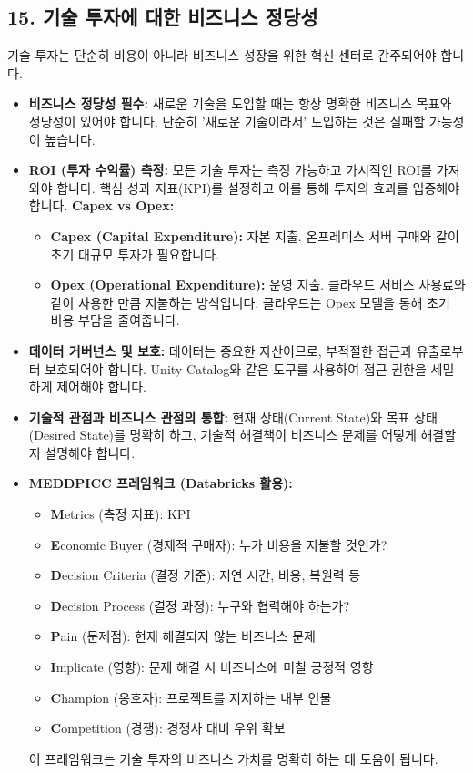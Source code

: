 \documentclass[11pt,a4paper]{article}
\begin{document}
\subsection*{15. 기술 투자에 대한 비즈니스 정당성}

기술 투자는 단순히 비용이 아니라 비즈니스 성장을 위한 혁신 센터로 간주되어야 합니다.

\begin{itemize}
    \item \textbf{비즈니스 정당성 필수:} 새로운 기술을 도입할 때는 항상 명확한 비즈니스 목표와 정당성이 있어야 합니다. 단순히 '새로운 기술이라서' 도입하는 것은 실패할 가능성이 높습니다.
    \item \textbf{ROI (투자 수익률) 측정:} 모든 기술 투자는 측정 가능하고 가시적인 ROI를 가져와야 합니다. 핵심 성과 지표(KPI)를 설정하고 이를 통해 투자의 효과를 입증해야 합니다.
    \textbf{Capex vs Opex:}
    \begin{itemize}
        \item \textbf{Capex (Capital Expenditure):} 자본 지출. 온프레미스 서버 구매와 같이 초기 대규모 투자가 필요합니다.
        \item \textbf{Opex (Operational Expenditure):} 운영 지출. 클라우드 서비스 사용료와 같이 사용한 만큼 지불하는 방식입니다. 클라우드는 Opex 모델을 통해 초기 비용 부담을 줄여줍니다.
    \end{itemize}
    \item \textbf{데이터 거버넌스 및 보호:} 데이터는 중요한 자산이므로, 부적절한 접근과 유출로부터 보호되어야 합니다. Unity Catalog와 같은 도구를 사용하여 접근 권한을 세밀하게 제어해야 합니다.
    \item \textbf{기술적 관점과 비즈니스 관점의 통합:} 현재 상태(Current State)와 목표 상태(Desired State)를 명확히 하고, 기술적 해결책이 비즈니스 문제를 어떻게 해결할지 설명해야 합니다.
    \item \textbf{MEDDPICC 프레임워크 (Databricks 활용):}
    \begin{itemize}
        \item \textbf{M}etrics (측정 지표): KPI
        \item \textbf{E}conomic Buyer (경제적 구매자): 누가 비용을 지불할 것인가?
        \item \textbf{D}ecision Criteria (결정 기준): 지연 시간, 비용, 복원력 등
        \item \textbf{D}ecision Process (결정 과정): 누구와 협력해야 하는가?
        \item \textbf{P}ain (문제점): 현재 해결되지 않는 비즈니스 문제
        \item \textbf{I}mplicate (영향): 문제 해결 시 비즈니스에 미칠 긍정적 영향
        \item \textbf{C}hampion (옹호자): 프로젝트를 지지하는 내부 인물
        \item \textbf{C}ompetition (경쟁): 경쟁사 대비 우위 확보
    \end{itemize}
    이 프레임워크는 기술 투자의 비즈니스 가치를 명확히 하는 데 도움이 됩니다.
\end{itemize}
\end{document}
